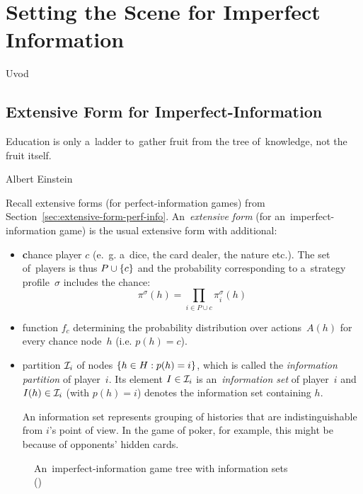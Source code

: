 \chapter{Setting the Scene for Imperfect Information}
\todo Uvod

\section{Extensive Form for Imperfect-Information}
\label{sec:extensive-form-imperf-info}
\epigraph{
  Education is only a~ladder to~gather fruit from the tree of~knowledge, not the fruit itself.
}{Albert Einstein}
Recall extensive forms (for perfect-information games) from Section~\ref{sec:extensive-form-perf-info}.
An~\emph{extensive form} (for an~imperfect-information game) is the usual extensive form with additional:
\begin{itemize}
  \item \textbf{c}hance player $c$ (e.~g. a~dice, the card dealer, the nature etc.).
    The set of~players is thus $P \cup \left\{ c \right\}$ and the probability corresponding to a~strategy profile~$\sigma$ includes the chance:
    \[\pi ^\sigma(h) = \prod _{i \in P \cup {c}} \pi _i ^\sigma (h)\]

  \item function $f_c$ determining the probability distribution over actions~$A(h)$ for every chance node~$h$ (i.e. $p(h) = c$).

  \item partition $\mathcal{I}_i$ of nodes $\left\{ h \in H: p(h) = i \right\}$, which is called the \emph{information partition} of player~$i$.
    Its element $I \in \mathcal{I}_i$ is an~\emph{information set} of player~$i$ and $I(h) \in \mathcal{I}_i$ (with $p(h) = i$) denotes the information set containing $h$.

    An information set represents grouping of histories that are indistinguishable from $i$'s point of view.
    In the game of poker, for example, this might be because of  opponents' hidden cards.
\end{itemize}
\noindent
\begin{figure}[H]
  \centering
  \scriptsize
  \def\svgwidth{.7\textwidth}
  
  \def\captionTitle{An~imperfect-information game tree with information sets}
  \caption[\captionTitle]{\captionTitle{} \\(\cite[p.~67]{AGT07})}
  \label{fig:strategic-form-tree}
\end{figure}
